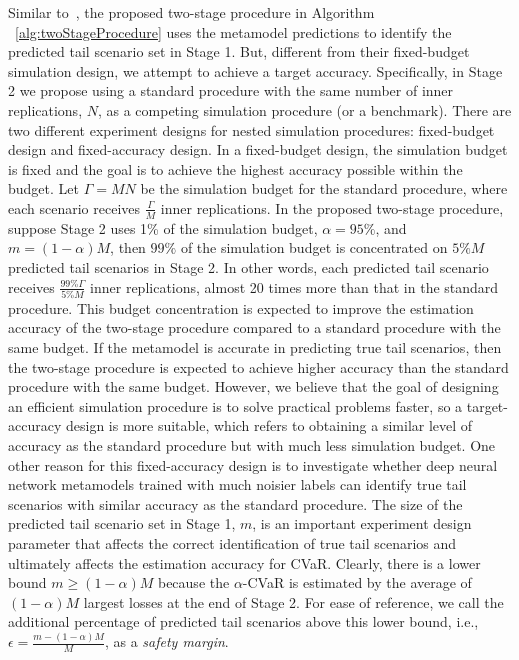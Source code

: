 \documentclass{article}
\begin{document}
Similar to~\cite{dang2020efficient}, the proposed two-stage procedure in Algorithm ~\ref{alg:twoStageProcedure} uses the metamodel predictions to identify the predicted tail scenario set in Stage 1.
But, different from their fixed-budget simulation design, we attempt to achieve a target accuracy.
Specifically, in Stage 2 we propose using a standard procedure with the same number of inner replications, $N$, as a competing simulation procedure (or a benchmark).
There are two different experiment designs for nested simulation procedures: fixed-budget design and fixed-accuracy design.
In a fixed-budget design, the simulation budget is fixed and the goal is to achieve the highest accuracy possible within the budget.
Let $\Gamma = MN$ be the simulation budget for the standard procedure, where each scenario receives $\frac{\Gamma}{M}$ inner replications.
In the proposed two-stage procedure, suppose Stage 2 uses 1\% of the simulation budget, $\alpha = 95\%$, and $m=(1-\alpha)M$, then $99\%$ of the simulation budget is concentrated on $5\% M$ predicted tail scenarios in Stage 2.
In other words, each predicted tail scenario receives $\frac{99\% \Gamma}{5\% M}$ inner replications, almost 20 times more than that in the standard procedure.
This budget concentration is expected to improve the estimation accuracy of the two-stage procedure compared to a standard procedure with the same budget. 
If the metamodel is accurate in predicting true tail scenarios, then the two-stage procedure is expected to achieve higher accuracy than the standard procedure with the same budget.
However, we believe that the goal of designing an efficient simulation procedure is to solve practical problems faster, so a target-accuracy design is more suitable, which refers to obtaining a similar level of accuracy as the standard procedure but with much less simulation budget.
One other reason for this fixed-accuracy design is to investigate whether deep neural network metamodels trained with much noisier labels can identify true tail scenarios with similar accuracy as the standard procedure.
The size of the predicted tail scenario set in Stage 1, $m$, is an important experiment design parameter that affects the correct identification of true tail scenarios and ultimately affects the estimation accuracy for CVaR.
Clearly, there is a lower bound $m \geq (1-\alpha)M$ because the $\alpha$-CVaR is estimated by the average of $(1-\alpha)M$ largest losses at the end of Stage 2.
For ease of reference, we call the additional percentage of predicted tail scenarios above this lower bound, i.e., $\epsilon = \frac{m - (1-\alpha)M}{M}$, as a \textit{safety margin}.
\end{document}
